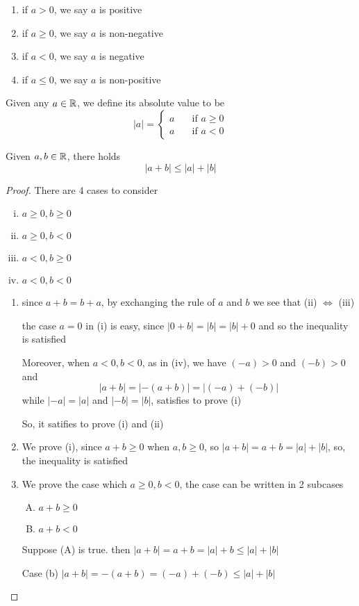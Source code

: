 \begin{enumerate}
  \item if $a > 0$, we say $a$ is positive
  \item if $a \ge 0$, we say $a$ is non-negative
  \item if $a < 0$, we say $a$ is negative
  \item if $a \le 0$, we say $a$ is non-positive
\end{enumerate}

\begin{definition}
Given any $a\in\mathbb R$, we define its absolute value to be
\[ |a| =
  \begin{cases}
    a       & \quad \text{if } a \geq 0 \\
    a  & \quad \text{if } a < 0
  \end{cases}
\]
\end{definition}

\begin{theorem}
Given $a, b\in\mathbb R$, there holds
$$|a+b|\leq |a| + |b|$$
\end{theorem}

\begin{proof}
  There are 4 cases to consider
  \begin{enumerate}[(i)]
    \item $a \ge 0, b \ge 0$
    \item $a \ge 0, b < 0$
    \item $a < 0, b \ge 0$
    \item $a < 0, b < 0$ 
  \end{enumerate}
  \begin{enumerate}[step 1.]
    \item since $a+b = b+a$, by exchanging the rule of $a$ and $b$ we see that (ii) $\iff$ (iii)

    the case $a = 0$ in (i) is easy, since $|0 + b| = |b| = |b| + 0$ and so the inequality is satisfied

    Moreover, when $a < 0, b < 0$, as in (iv), we have $(-a) > 0$ and $(-b) > 0$ and 
    \[|a+b| = |-(a+b)| = |(-a)+(-b)|\] 
    while $|-a| = |a|$ and $|-b| = |b|$, satisfies to prove (i)

    So, it satifies to prove (i) and (ii)
    \item We prove (i), since $a + b \ge 0$ when $a, b \ge 0$, so $|a + b| = a + b = |a| + |b|$, so, the inequality is satisfied
    \item We prove the case which $a \ge 0, b < 0$, the case can be written in 2 subcases
    \begin{enumerate}[(A)]
      \item $a + b \ge 0$
      \item $a + b < 0$
    \end{enumerate}
    Suppose (A) is true. then $|a + b| = a + b = |a| + b \le |a| + |b|$

    Case (b) $|a +b| = -(a + b) = (-a) + (-b) \le |a| + |b|$
  \end{enumerate}
\end{proof}
